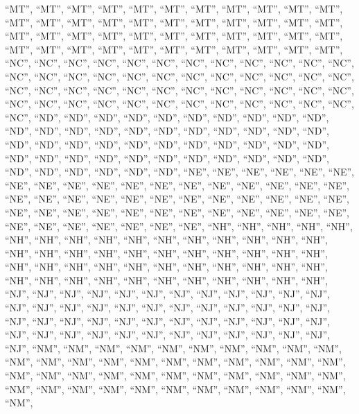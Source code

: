 \documentclass[
]{article}
\begin{document}
``MT'', ``MT'', ``MT'', ``MT'', ``MT'', ``MT'', ``MT'', ``MT'', ``MT'',
``MT'', ``MT'', ``MT'', ``MT'', ``MT'', ``MT'', ``MT'', ``MT'', ``MT'',
``MT'', ``MT'', ``MT'', ``MT'', ``MT'', ``MT'', ``MT'', ``MT'', ``MT'',
``MT'', ``MT'', ``MT'', ``MT'', ``MT'', ``MT'', ``MT'', ``MT'', ``MT'',
``MT'', ``MT'', ``MT'', ``MT'', ``MT'', ``MT'', ``MT'', ``MT'', ``NC'',
``NC'', ``NC'', ``NC'', ``NC'', ``NC'', ``NC'', ``NC'', ``NC'', ``NC'',
``NC'', ``NC'', ``NC'', ``NC'', ``NC'', ``NC'', ``NC'', ``NC'', ``NC'',
``NC'', ``NC'', ``NC'', ``NC'', ``NC'', ``NC'', ``NC'', ``NC'', ``NC'',
``NC'', ``NC'', ``NC'', ``NC'', ``NC'', ``NC'', ``NC'', ``NC'', ``NC'',
``NC'', ``NC'', ``NC'', ``NC'', ``NC'', ``NC'', ``NC'', ``NC'', ``NC'',
``NC'', ``NC'', ``NC'', ``ND'', ``ND'', ``ND'', ``ND'', ``ND'', ``ND'',
``ND'', ``ND'', ``ND'', ``ND'', ``ND'', ``ND'', ``ND'', ``ND'', ``ND'',
``ND'', ``ND'', ``ND'', ``ND'', ``ND'', ``ND'', ``ND'', ``ND'', ``ND'',
``ND'', ``ND'', ``ND'', ``ND'', ``ND'', ``ND'', ``ND'', ``ND'', ``ND'',
``ND'', ``ND'', ``ND'', ``ND'', ``ND'', ``ND'', ``ND'', ``ND'', ``ND'',
``ND'', ``ND'', ``ND'', ``ND'', ``ND'', ``ND'', ``ND'', ``NE'', ``NE'',
``NE'', ``NE'', ``NE'', ``NE'', ``NE'', ``NE'', ``NE'', ``NE'', ``NE'',
``NE'', ``NE'', ``NE'', ``NE'', ``NE'', ``NE'', ``NE'', ``NE'', ``NE'',
``NE'', ``NE'', ``NE'', ``NE'', ``NE'', ``NE'', ``NE'', ``NE'', ``NE'',
``NE'', ``NE'', ``NE'', ``NE'', ``NE'', ``NE'', ``NE'', ``NE'', ``NE'',
``NE'', ``NE'', ``NE'', ``NE'', ``NE'', ``NE'', ``NE'', ``NE'', ``NE'',
``NE'', ``NE'', ``NH'', ``NH'', ``NH'', ``NH'', ``NH'', ``NH'', ``NH'',
``NH'', ``NH'', ``NH'', ``NH'', ``NH'', ``NH'', ``NH'', ``NH'', ``NH'',
``NH'', ``NH'', ``NH'', ``NH'', ``NH'', ``NH'', ``NH'', ``NH'', ``NH'',
``NH'', ``NH'', ``NH'', ``NH'', ``NH'', ``NH'', ``NH'', ``NH'', ``NH'',
``NH'', ``NH'', ``NH'', ``NH'', ``NH'', ``NH'', ``NH'', ``NH'', ``NH'',
``NH'', ``NH'', ``NH'', ``NH'', ``NH'', ``NH'', ``NJ'', ``NJ'', ``NJ'',
``NJ'', ``NJ'', ``NJ'', ``NJ'', ``NJ'', ``NJ'', ``NJ'', ``NJ'', ``NJ'',
``NJ'', ``NJ'', ``NJ'', ``NJ'', ``NJ'', ``NJ'', ``NJ'', ``NJ'', ``NJ'',
``NJ'', ``NJ'', ``NJ'', ``NJ'', ``NJ'', ``NJ'', ``NJ'', ``NJ'', ``NJ'',
``NJ'', ``NJ'', ``NJ'', ``NJ'', ``NJ'', ``NJ'', ``NJ'', ``NJ'', ``NJ'',
``NJ'', ``NJ'', ``NJ'', ``NJ'', ``NJ'', ``NJ'', ``NJ'', ``NJ'', ``NJ'',
``NJ'', ``NM'', ``NM'', ``NM'', ``NM'', ``NM'', ``NM'', ``NM'', ``NM'',
``NM'', ``NM'', ``NM'', ``NM'', ``NM'', ``NM'', ``NM'', ``NM'', ``NM'',
``NM'', ``NM'', ``NM'', ``NM'', ``NM'', ``NM'', ``NM'', ``NM'', ``NM'',
``NM'', ``NM'', ``NM'', ``NM'', ``NM'', ``NM'', ``NM'', ``NM'', ``NM'',
``NM'', ``NM'', ``NM'', ``NM'', ``NM'', ``NM'', ``NM'', ``NM'', ``NM'',
\end{document}
